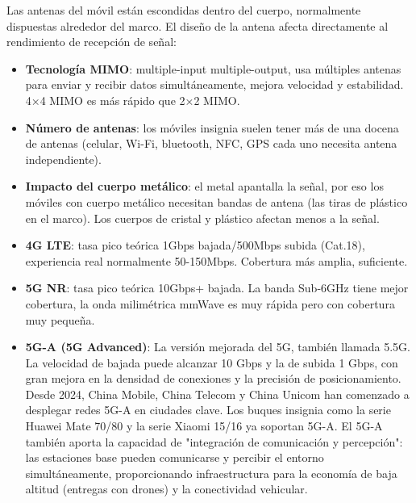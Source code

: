 
Las antenas del móvil están escondidas dentro del cuerpo, normalmente dispuestas alrededor del marco. El diseño de la antena afecta directamente al rendimiento de recepción de señal:

\begin{itemize}
  \item \textbf{Tecnología MIMO}: multiple-input multiple-output, usa múltiples antenas para enviar y recibir datos simultáneamente, mejora velocidad y estabilidad. 4×4 MIMO es más rápido que 2×2 MIMO.
  \item \textbf{Número de antenas}: los móviles insignia suelen tener más de una docena de antenas (celular, Wi-Fi, bluetooth, NFC, GPS cada uno necesita antena independiente).
  \item \textbf{Impacto del cuerpo metálico}: el metal apantalla la señal, por eso los móviles con cuerpo metálico necesitan bandas de antena (las tiras de plástico en el marco). Los cuerpos de cristal y plástico afectan menos a la señal.
\end{itemize}


\begin{itemize}
  \item \textbf{4G LTE}: tasa pico teórica 1Gbps bajada/500Mbps subida (Cat.18), experiencia real normalmente 50-150Mbps. Cobertura más amplia, suficiente.
  \item \textbf{5G NR}: tasa pico teórica 10Gbps+ bajada. La banda Sub-6GHz tiene mejor cobertura, la onda milimétrica mmWave es muy rápida pero con cobertura muy pequeña.
  \item \textbf{5G-A (5G Advanced)}: La versión mejorada del 5G, también llamada 5.5G. La velocidad de bajada puede alcanzar 10 Gbps y la de subida 1 Gbps, con gran mejora en la densidad de conexiones y la precisión de posicionamiento. Desde 2024, China Mobile, China Telecom y China Unicom han comenzado a desplegar redes 5G-A en ciudades clave. Los buques insignia como la serie Huawei Mate 70/80 y la serie Xiaomi 15/16 ya soportan 5G-A. El 5G-A también aporta la capacidad de "integración de comunicación y percepción": las estaciones base pueden comunicarse y percibir el entorno simultáneamente, proporcionando infraestructura para la economía de baja altitud (entregas con drones) y la conectividad vehicular.
\end{itemize}


